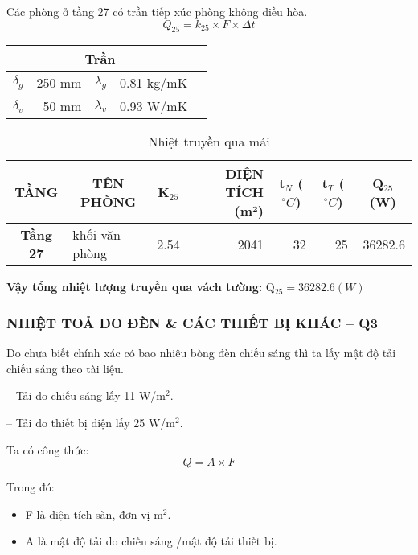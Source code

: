 Các phòng ở tầng 27 có trần tiếp xúc phòng không điều hòa.
\begin{equation*}
	Q_{25} = k_{25}\times F\times \Delta t
\end{equation*}
\begin{table}[H]
	\centering
	\begin{tabular}{|r|r|r|r|r|}
		\hline
		\multicolumn{4}{|c|}{\textbf{Trần}} \bigstrut\\
		\hline
		\textbf{{\large $\delta_{g}$}} & 250 mm & {\large $\lambda_{g}$} & 0.81 kg/mK \bigstrut\\
		\hline
		\textbf{{\large $\delta_{v}$}} & 50 mm & \textbf{{\large $\lambda_{v}$}} & 0.93 W/mK \bigstrut\\	
		\hline
	\end{tabular}
	\label{b:kct}
\end{table}
\begin{table}[H]
	\centering
	\caption{Nhiệt truyền qua mái}
	\begin{tabular}{|c|l|r|r|r|r|r|}
		\hline
		\textbf{ TẦNG} & \multicolumn{1}{c|}{\textbf{TÊN PHÒNG}} & \multicolumn{1}{c|}{\textbf{K$ _{25} $}} & \multicolumn{1}{p{6.145em}|}{\textbf{DIỆN TÍCH (m²) }} & \multicolumn{1}{c|}{\textbf{t$_{N}$ ($^{\circ}C$)}} & \multicolumn{1}{c|}{\textbf{t$_{T}$ ($^{\circ}C$)}} & \multicolumn{1}{c|}{\textbf{Q$ _{25} $(W)}} \bigstrut\\
		\hline
		\textbf{Tầng 27} & khối văn phòng & 2.54     & 2041     & 32       & 25       & 36282.6 \bigstrut\\
		\hline
	\end{tabular}%
	\label{b:ntqm}%
\end{table}%
\textbf{Vậy tổng nhiệt lượng truyền qua vách tường:} Q$_{25} = 36282.6(W)$

\subsubsection{NHIỆT TOẢ DO ĐÈN \& CÁC THIẾT BỊ KHÁC -- Q{\scriptsize 3}}

Do chưa biết chính xác có bao nhiêu bòng đèn chiếu sáng thì ta lấy mật độ tải chiếu sáng theo tài liệu.

-- Tải do chiếu sáng lấy 11 W/m$^2$.

-- Tải do thiết bị điện lấy 25 W/m$^2$.

Ta có công thức:
\begin{equation*}
	Q = A\times F
\end{equation*}

Trong đó:
\begin{itemize}
	\item F là diện tích sàn, đơn vị m$^2$.
	\item A là mật độ tải do chiếu sáng /mật độ tải thiết bị.
\end{itemize}

